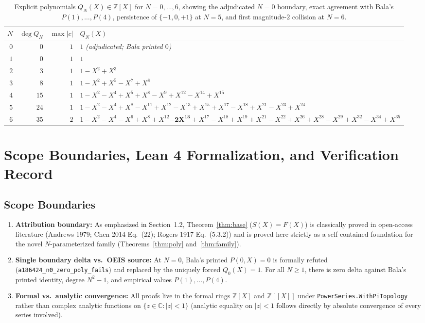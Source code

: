 \documentclass[11pt]{article}
\newcommand{\llbracket}{[\![}
\newcommand{\rrbracket}{]\!]}
\theoremstyle{definition}
\newcommand{\Z}{\mathbb{Z}}
\begin{document}
\begin{table}[ht]
\centering
\caption{Explicit polynomials $Q_N(X) \in \Z[X]$ for $N = 0, \dots, 6$, showing the adjudicated $N = 0$ boundary, exact agreement with Bala's $P(1), \dots, P(4)$, persistence of $\{-1, 0, +1\}$ at $N = 5$, and first magnitude-$2$ collision at $N = 6$.}
\label{tab:polys}
\smallskip
{\small
\begin{tabular}{@{}r r r >{\raggedright\arraybackslash}p{10.5cm}@{}}
\toprule
$N$ & $\deg Q_N$ & $\max |c|$ & $Q_N(X)$ \\
\midrule
$0$ & $0$ & $1$ & $1$ \quad \emph{(adjudicated; Bala printed $0$)} \\
$1$ & $0$ & $1$ & $1$ \\
$2$ & $3$ & $1$ & $1 - X^2 + X^3$ \\
$3$ & $8$ & $1$ & $1 - X^2 + X^5 - X^7 + X^8$ \\
$4$ & $15$ & $1$ & $1 - X^2 - X^4 + X^5 + X^8 - X^9 + X^{12} - X^{14} + X^{15}$ \\
$5$ & $24$ & $1$ & $1 - X^2 - X^4 + X^8 - X^{11} + X^{12} - X^{13} + X^{15} + X^{17} - X^{18} + X^{21} - X^{23} + X^{24}$ \\
$6$ & $35$ & $2$ & $1 - X^2 - X^4 - X^6 + X^8 + X^{12} \mathbf{- 2X^{13}} + X^{17} - X^{18} + X^{19} + X^{21} - X^{22} + X^{26} + X^{28} - X^{29} + X^{32} - X^{34} + X^{35}$ \\
\bottomrule
\end{tabular}
}
\end{table}

\section{Scope Boundaries, Lean 4 Formalization, and Verification Record}

\subsection{Scope Boundaries}
\begin{enumerate}\setlength{\itemsep}{2pt}
\item \textbf{Attribution boundary:} As emphasized in Section~1.2, Theorem~\ref{thm:base} ($S(X) = F(X)$) is classically proved in open-access literature (Andrews 1979; Chen 2014 Eq.~(22); Rogers 1917 Eq.~(5.3.2)) and is proved here strictly as a self-contained foundation for the novel $N$-parameterized family (Theorems~\ref{thm:poly} and~\ref{thm:family}).
\item \textbf{Single boundary delta vs.\ OEIS source:} At $N = 0$, Bala's printed $P(0, X) = 0$ is formally refuted (\texttt{a186424\_n0\_zero\_poly\_fails}) and replaced by the uniquely forced $Q_0(X) = 1$. For all $N \ge 1$, there is zero delta against Bala's printed identity, degree $N^2 - 1$, and empirical values $P(1), \dots, P(4)$.
\item \textbf{Formal vs.\ analytic convergence:} All proofs live in the formal rings $\Z[X]$ and $\Z\llbracket X \rrbracket$ under \texttt{PowerSeries.WithPiTopology} rather than complex analytic functions on $\{z \in \mathbb{C} : |z| < 1\}$ (analytic equality on $|z| < 1$ follows directly by absolute convergence of every series involved).
\end{enumerate}
\end{document}
